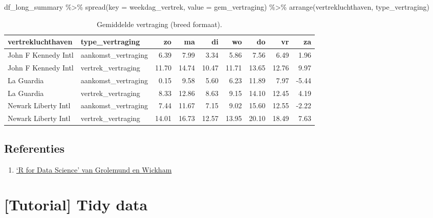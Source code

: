 \documentclass[]{tufte-book}
\newenvironment{Shaded}{}{}
\newcommand{\AttributeTok}[1]{\textcolor[rgb]{0.49,0.56,0.16}{#1}}
\newcommand{\FunctionTok}[1]{\textcolor[rgb]{0.02,0.16,0.49}{#1}}
\newcommand{\NormalTok}[1]{#1}
\newcommand{\SpecialCharTok}[1]{\textcolor[rgb]{0.25,0.44,0.63}{#1}}
\providecommand{\tightlist}{%
  \setlength{\itemsep}{0pt}\setlength{\parskip}{0pt}}
\begin{document}
\begin{Shaded}
\begin{Highlighting}[]
\NormalTok{df\_long\_summary }\SpecialCharTok{\%\textgreater{}\%}
  \FunctionTok{spread}\NormalTok{(}\AttributeTok{key =}\NormalTok{ weekdag\_vertrek, }\AttributeTok{value =}\NormalTok{ gem\_vertraging) }\SpecialCharTok{\%\textgreater{}\%}
  \FunctionTok{arrange}\NormalTok{(vertrekluchthaven, type\_vertraging)}
\end{Highlighting}
\end{Shaded}

\begin{table}

\caption{\label{tab:7-15b}Gemiddelde vertraging (breed formaat).}
\centering
\fontsize{10}{12}\selectfont
\begin{tabular}[t]{llrrrrrrr}
\toprule
vertrekluchthaven & type\_vertraging & zo & ma & di & wo & do & vr & za\\
\midrule
John F Kennedy Intl & aankomst\_vertraging & 6.39 & 7.99 & 3.34 & 5.86 & 7.56 & 6.49 & 1.96\\
John F Kennedy Intl & vertrek\_vertraging & 11.70 & 14.74 & 10.47 & 11.71 & 13.65 & 12.76 & 9.97\\
La Guardia & aankomst\_vertraging & 0.15 & 9.58 & 5.60 & 6.23 & 11.89 & 7.97 & -5.44\\
La Guardia & vertrek\_vertraging & 8.33 & 12.86 & 8.63 & 9.15 & 14.10 & 12.45 & 4.19\\
Newark Liberty Intl & aankomst\_vertraging & 7.44 & 11.67 & 7.15 & 9.02 & 15.60 & 12.55 & -2.22\\
\addlinespace
Newark Liberty Intl & vertrek\_vertraging & 14.01 & 16.73 & 12.57 & 13.95 & 20.10 & 18.49 & 7.63\\
\bottomrule
\end{tabular}
\end{table}

\hypertarget{referenties-4}{%
\section{Referenties}\label{referenties-4}}

\begin{enumerate}
\def\labelenumi{\arabic{enumi}.}
\tightlist
\item
  \href{http://r4ds.had.co.nz/}{`R for Data Science' van Grolemund en Wickham}
\end{enumerate}

\hypertarget{tutorial-tidy-data}{%
\chapter{{[}Tutorial{]} Tidy data}\label{tutorial-tidy-data}}
\end{document}
